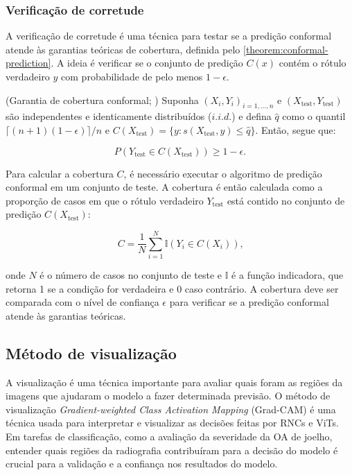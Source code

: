 \subsubsection{Verificação de corretude}

A verificação de corretude é uma técnica para testar se a predição conformal atende às garantias teóricas de cobertura, definida pelo \autoref{theorem:conformal-prediction}. A ideia é verificar se o conjunto de predição $C(x)$ contém o rótulo verdadeiro $y$ com probabilidade de pelo menos $1 - \epsilon$.

\begin{theorem}
\label{theorem:conformal-prediction}
    (Garantia de cobertura conformal; ) Suponha $(X_i,Y_i)_{i=1,...,n}$ e $(X_\text{test},Y_\text{test})$ são independentes e identicamente distribuídos ($i.i.d.$) e defina $\hat{q}$ como o quantil ${\lceil (n+1)(1-\epsilon) \rceil}/n$ e $C(X_\text{test}) = \lbrace y : s(X_\text{test},y) \leq \hat{q} \rbrace$. Então, segue que:

    \begin{equation}
        P(Y_\text{test} \in C(X_\text{test})) \geq 1 - \epsilon.
    \end{equation}
\end{theorem}

Para calcular a cobertura $C$, é necessário executar o algoritmo de predição conformal em um conjunto de teste. A cobertura é então calculada como a proporção de casos em que o rótulo verdadeiro $Y_\text{test}$ está contido no conjunto de predição $C(X_\text{test})$:

\begin{equation}
    C = \frac{1}{N} \sum_{i=1}^{N} \mathbb{I}(Y_i \in C(X_i)) \text{,}
\end{equation}

onde $N$ é o número de casos no conjunto de teste e $\mathbb{I}$ é a função indicadora, que retorna 1 se a condição for verdadeira e 0 caso contrário. A cobertura deve ser comparada com o nível de confiança $\epsilon$ para verificar se a predição conformal atende às garantias teóricas.

\subsection{Método de visualização}

A visualização é uma técnica importante para avaliar quais foram as regiões da imagens que ajudaram o modelo a fazer determinada previsão. O método de visualização \textit{Gradient-weighted Class Activation Mapping} (Grad-CAM) é uma técnica usada para interpretar e visualizar as decisões feitas por RNCs e ViTs. Em tarefas de classificação, como a avaliação da severidade da OA de joelho, entender quais regiões da radiografia contribuíram para a decisão do modelo é crucial para a validação e a confiança nos resultados do modelo.

